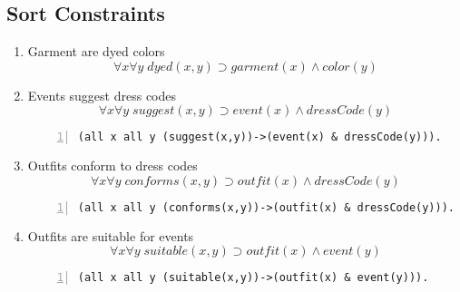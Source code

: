 \documentclass[paper=a4, fontsize=11pt]{scrartcl} %
\numberwithin{equation}{section} %
\numberwithin{figure}{section} %
\numberwithin{table}{section} %
\begin{document}

\subsection{Sort Constraints}
\begin{enumerate}
	
	
\item Garment are dyed colors
\begin{equation*}
	\forall x \forall y \; dyed(x,y) \supset garment(x) \land color(y)
\end{equation*}
	

\item Events suggest dress codes
\begin{equation*}
	\forall x \forall y \; suggest(x,y) \supset event(x) \land dressCode(y)
\end{equation*}
\begin{Verbatim}[gobble=2, numbers=left]
	(all x all y (suggest(x,y))->(event(x) & dressCode(y))).
\end{Verbatim}
	

\item Outfits conform to dress codes
\begin{equation*}
	\forall x \forall y \; conforms(x,y) \supset outfit(x) \land dressCode(y)
\end{equation*}
\begin{Verbatim}[gobble=2, numbers=left]
	(all x all y (conforms(x,y))->(outfit(x) & dressCode(y))).
\end{Verbatim}


\item Outfits are suitable for events
\begin{equation*}
	\forall x \forall y \; suitable(x,y) \supset outfit(x) \land event(y)
\end{equation*}
\begin{Verbatim}[gobble=2, numbers=left]
	(all x all y (suitable(x,y))->(outfit(x) & event(y))).
\end{Verbatim}
	

\end{enumerate}
\end{document}
